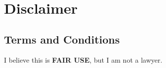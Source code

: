 \thispagestyle{plain}

\chapter*{Disclaimer}

\section*{Terms and Conditions}

\noindent
I believe this is \textbf{FAIR USE}, but I am not a lawyer.



